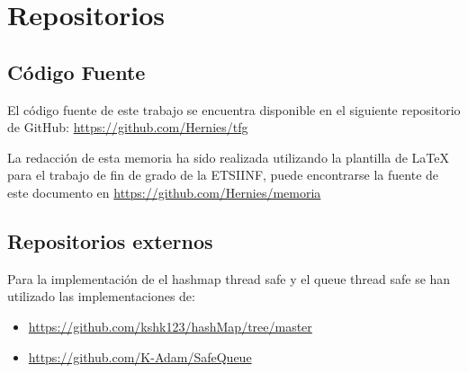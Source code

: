 \chapter{Repositorios}
\section{Código Fuente}
El código fuente de este trabajo se encuentra disponible en el siguiente repositorio de GitHub: \url{https://github.com/Hernies/tfg}

La redacción de esta memoria ha sido realizada utilizando la plantilla de LaTeX para el trabajo de fin de grado de la ETSIINF, puede encontrarse la fuente de este documento en \url{https://github.com/Hernies/memoria}

\section{Repositorios externos}
Para la implementación de el hashmap thread safe y el queue thread safe se han utilizado las implementaciones de:

\begin{itemize}
    \item \url{https://github.com/kshk123/hashMap/tree/master}
    \item \url{https://github.com/K-Adam/SafeQueue}
\end{itemize}
